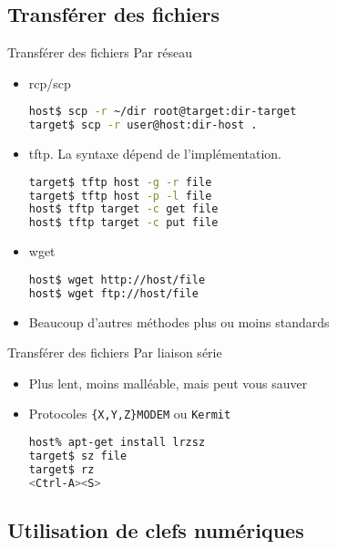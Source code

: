 \subsection{Transférer des fichiers}

\begin{frame}[fragile=singleslide]{Transférer des fichiers}
  Par réseau
  \begin{itemize}
  \item rcp/scp
\begin{lstlisting}[language=sh]
host$ scp -r ~/dir root@target:dir-target
target$ scp -r user@host:dir-host .
\end{lstlisting} %
  \item tftp. La syntaxe dépend de l'implémentation.
  \note[item] 
\begin{lstlisting}[language=sh]
target$ tftp host -g -r file
target$ tftp host -p -l file
host$ tftp target -c get file
host$ tftp target -c put file
\end{lstlisting} %
  \item wget
\begin{lstlisting}[language=sh]
host$ wget http://host/file
host$ wget ftp://host/file
\end{lstlisting} %
  \item Beaucoup d'autres méthodes plus ou moins standards
  \end{itemize}
\end{frame}

\begin{frame}[fragile=singleslide]{Transférer des fichiers}
  Par liaison série
  \begin{itemize}
  \item Plus lent, moins malléable, mais peut vous sauver
  \item Protocoles \verb+{X,Y,Z}MODEM+ ou \verb+Kermit+
\begin{lstlisting}[language=sh]
host% apt-get install lrzsz
target$ sz file
target$ rz
<Ctrl-A><S>
\end{lstlisting} %
  \end{itemize}
\end{frame}

\subsection{Utilisation de clefs numériques}

